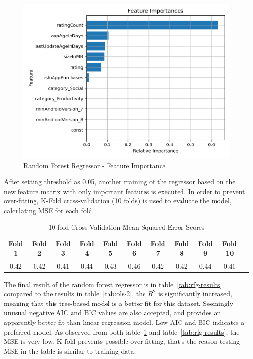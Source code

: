 \begin{figure}
    \centering
    \includegraphics[width=1\linewidth]{docs//assets/regressor_feature_importances.png}
    \caption{Random Forest Regressor - Feature Importance}
    \label{fig:rfg}
\end{figure}

After setting threshold as 0.05, another training of the regressor based on the new feature matrix with only important features is executed. In order to prevent over-fitting, K-Fold cross-validation (10 folds) is used to evaluate the model, calculating MSE for each fold.

\begin{table}[h]
\centering
\scriptsize
\begin{tabular}{|c|c|c|c|c|c|c|c|c|c|c|}
\hline
\textbf{Fold 1} & \textbf{Fold 2} & \textbf{Fold 3} & \textbf{Fold 4} & \textbf{Fold 5} & \textbf{Fold 6} & \textbf{Fold 7} & \textbf{Fold 8} & \textbf{Fold 9} & \textbf{Fold 10} \\
\hline
0.42 & 0.42 & 0.41 & 0.44 & 0.43 & 0.46 & 0.42 & 0.42 & 0.44 & 0.40 \\
\hline
\end{tabular}
\caption{10-fold Cross Validation Mean Squared Error Scores}
\label{tab:kfold_scores}
\end{table}

The final result of the random forest regressor is in table~\ref{tab:rfg-results}, compared to the results in table~\ref{tab:ols-2}, the $R^{2}$ is significantly increased, meaning that this tree-based model is a better fit for this dataset. Seemingly unusual negative AIC and BIC values are also accepted\cite{burnham2003model}, and provides an apparently better fit than linear regression model. Low AIC and BIC indicates a preferred model. As observed from both table~\ref{tab:kfold_scores} and table~\ref{tab:rfg-results}, the MSE is very low. K-fold prevents possible over-fitting, that's the reason testing MSE in the table is similar to training data.



